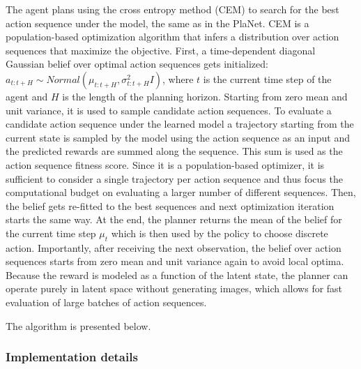 The agent plans using the cross entropy method (CEM) \cite{Algo.CEM} to search for the best action sequence under the model, the same as in the PlaNet. CEM is a population-based optimization algorithm that infers a distribution over action sequences that maximize the objective.
First, a time-dependent diagonal Gaussian belief over optimal action sequences gets initialized: $a_{t:t+H} \sim Normal(\mu_{t:t+H}, \sigma^2_{t:t+H}I)$, where $t$ is the current time step of the agent and $H$ is the length of the planning horizon. Starting from zero mean and unit variance, it is used to sample candidate action sequences. To evaluate a candidate action sequence under the learned model a trajectory starting from the current state is sampled by the model using the action sequence as an input and the predicted rewards are summed along the sequence. This sum is used as the action sequence fitness score. Since it is a population-based optimizer, it is sufficient to consider a single trajectory per action sequence and thus focus the computational budget on evaluating a larger number of different sequences. Then, the belief gets re-fitted to the best sequences and next optimization iteration starts the same way. At the end, the planner returns the mean of the belief for the current time step $\mu_t$ which is then used by the policy to choose discrete action. Importantly, after receiving the next observation, the belief over action sequences starts from zero mean and unit variance again to avoid local optima. \\
Because the reward is modeled as a function of the latent state, the planner can operate purely in latent space without generating images, which allows for fast evaluation of large batches of action sequences.

The algorithm is presented below.

\subsubsection{Implementation details}

